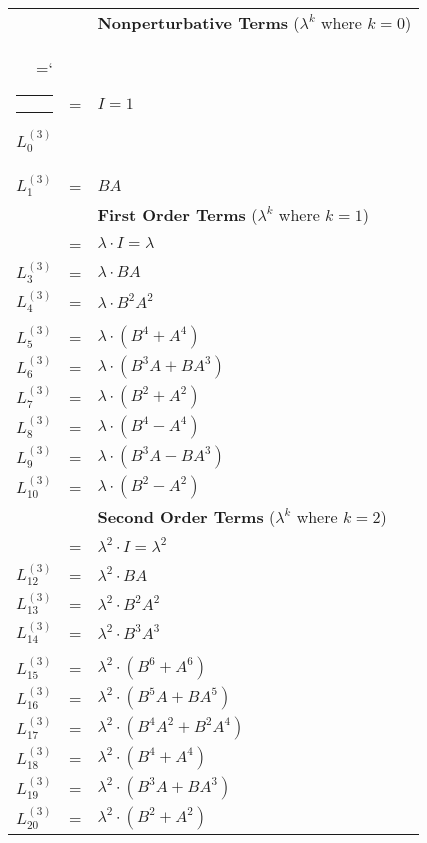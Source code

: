 \documentclass{article}
\makeatletter
\def\nobreakhline{%
  \noalign{\ifnum0=`}\fi
    \penalty\@M
    \futurelet\@let@token\LT@@nobreakhline}
\def\LT@@nobreakhline{%
  \ifx\@let@token\hline
    \global\let\@gtempa\@gobble
    \gdef\LT@sep{\penalty\@M\vskip\doublerulesep}%
  \else
    \global\let\@gtempa\@empty
    \gdef\LT@sep{\penalty\@M\vskip-\arrayrulewidth}%
  \fi
  \ifnum0=`{\fi}%
  \multispan\LT@cols
     \unskip\leaders\hrule\@height\arrayrulewidth\hfill\cr
  \noalign{\LT@sep}%
  \multispan\LT@cols
     \unskip\leaders\hrule\@height\arrayrulewidth\hfill\cr
  \noalign{\penalty\@M}%
  \@gtempa}
\makeatother
\begin{document}
\begin{center}
\begin{longtable}{rcl}
               &   & \textbf{Nonperturbative Terms} ($\lambda^{k}$ where $k=0$) \\*
\nobreakhline
$L_{0}^{(3)}$  & = & $I = 1$ \\*
$L_{1}^{(3)}$  & = & $BA$ \\
               &   & \textbf{First Order Terms} ($\lambda^{k}$ where $k=1$) \\*
\nobreakhline         
$L_{2}^{(3)}$  & = & ${\lambda}{\cdot}I = {\lambda}$ \\*
$L_{3}^{(3)}$  & = & ${\lambda}{\cdot}BA$ \\*
$L_{4}^{(3)}$  & = & ${\lambda}{\cdot}B^{2}A^{2}$ \\*
               &   & \\*
$L_{5}^{(3)}$  & = & ${\lambda}{\cdot}(B^{4}+A^{4})$ \\*
$L_{6}^{(3)}$  & = & ${\lambda}{\cdot}(B^{3}A+BA^{3})$ \\*
$L_{7}^{(3)}$  & = & ${\lambda}{\cdot}(B^{2}+A^{2})$ \\*
$L_{8}^{(3)}$  & = & ${\lambda}{\cdot}(B^{4}-A^{4})$ \\*
$L_{9}^{(3)}$  & = & ${\lambda}{\cdot}(B^{3}A-BA^{3})$ \\*
$L_{10}^{(3)}$ & = & ${\lambda}{\cdot}(B^{2}-A^{2})$ \\
               &   & \textbf{Second Order Terms} ($\lambda^{k}$ where $k=2$) \\*
\nobreakhline         
$L_{11}^{(3)}$ & = & ${\lambda}^{2}{\cdot}I = {\lambda}^{2}$ \\*
$L_{12}^{(3)}$ & = & ${\lambda}^{2}{\cdot}BA$ \\*
$L_{13}^{(3)}$ & = & ${\lambda}^{2}{\cdot}B^{2}A^{2}$ \\*
$L_{14}^{(3)}$ & = & ${\lambda}^{2}{\cdot}B^{3}A^{3}$ \\*
               &   & \\*
$L_{15}^{(3)}$ & = & ${\lambda}^{2}{\cdot}(B^{6}+A^{6})$ \\*
$L_{16}^{(3)}$ & = & ${\lambda}^{2}{\cdot}(B^{5}A+BA^{5})$ \\*
$L_{17}^{(3)}$ & = & ${\lambda}^{2}{\cdot}(B^{4}A^{2}+B^{2}A^{4})$ \\*
$L_{18}^{(3)}$ & = & ${\lambda}^{2}{\cdot}(B^{4}+A^{4})$ \\*
$L_{19}^{(3)}$ & = & ${\lambda}^{2}{\cdot}(B^{3}A+BA^{3})$ \\*
$L_{20}^{(3)}$ & = & ${\lambda}^{2}{\cdot}(B^{2}+A^{2})$ \\*

\end{longtable}
\end{center}
\end{document}
